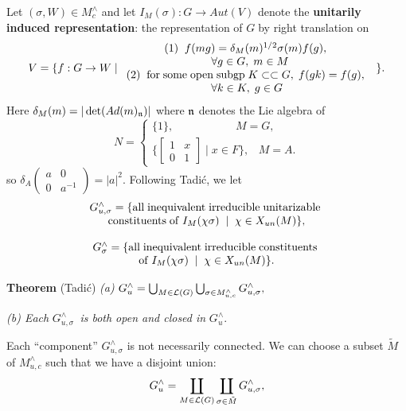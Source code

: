 Let $(\sigma ,W)\in M_c^{\wedge }$ and let $I_M(\sigma ):G\rightarrow Aut(V)$
denote the {\bf unitarily induced representation}: the representation of $%
G\; $by right translation on 
\[
V=\{f:G\rightarrow W\;|\; 
\begin{array}{c}
(1)\;\;f(mg)=\delta _M(m)^{1/2}\sigma (m)f(g),\;\; \\ 
\;\forall g\in G,\;m\in M \\ 
(2)\;\;{\rm for\;some\;open\;subgp}\;K\subset \subset G,\;f(gk)=f(g),\;\; \\ 
\forall k\in K,\;g\in G\;
\end{array}
\}. 
\]
Here $\delta _M(m)=|\det (Ad(m)_{{\frak n}})|$ where ${\frak n}$ denotes the
Lie algebra of 
\[
N=\left\{ 
\begin{array}{c}
\{1\},\;\;\;\;\;\;\;\;\;\;\;\;\;\;\;\;\;\;\;\;M=G, \\ 
\{\left[ 
\begin{array}{cc}
1 & x \\ 
0 & 1
\end{array}
\right] \;|\;x\in F\},\;\;\;M=A.
\end{array}
\right. 
\]
so $\delta _A( 
\begin{array}{cc}
a & 0 \\ 
0 & a^{-1}
\end{array}
)=|a|^2.$ Following Tadi\'c, we let 
\[
\begin{array}{c}
\begin{array}{c}
G_{u,\sigma }^{\wedge }=\{{\rm all\;inequivalent\;irreducible\;unitarizable\;%
} \\ 
{\rm constituents\;of\;}I_M(\chi \sigma )\;\;|\;\;\chi \in X_{un}(M)\},
\end{array}
\\ 
\\ 
\begin{array}{c}
G_\sigma ^{\wedge }=\{{\rm all\;inequivalent\;irreducible\;constituents\;}
\\ 
{\rm of\;}I_M(\chi \sigma )\;\;|\;\;\chi \in X_{un}(M)\}.
\end{array}
\end{array}
\]

{\bf Theorem} (Tadi\'c) {\em (a) }$G_u^{\wedge }=\bigcup_{M\in {\cal L}%
(G)}\bigcup_{\sigma \in M_{u,c}^{\wedge }}G_{u,\sigma }^{\wedge },$

{\em (b) Each }$G_{u,\sigma }^{\wedge }${\em \ is both open and closed in }$%
G_u^{\wedge }.$

Each ``component'' $G_{u,\sigma }^{\wedge }$ is not necessarily connected.
We can choose a subset $\tilde{M}$ of $M_{u,c}^{\wedge }$ such that
we have a disjoint union: 
\[
G_u^{\wedge }=\coprod_{M\in {\cal L}(G)}
\coprod_{\sigma \in \tilde{M}}G_{u,\sigma }^{\wedge }, 
\]

